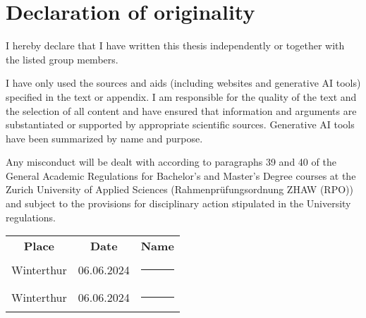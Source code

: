 \thispagestyle{empty}

\section*{Declaration of originality}

I hereby declare that I have written this thesis independently or together with the listed group members. 

I have only used the sources and aids (including websites and generative AI tools) specified in the text or appendix. I am responsible for the quality of the text and the selection of all content and have ensured that information and arguments are substantiated or supported by appropriate scientific sources. Generative AI tools have been summarized by name and purpose.

Any misconduct will be dealt with according to paragraphs 39 and 40 of the General Academic Regulations for Bachelor’s and Master’s Degree courses at the Zurich University of Applied Sciences (Rahmenprüfungsordnung ZHAW (RPO)) and subject to the provisions for disciplinary action stipulated in the University regulations.

\begin{table}[b]
    \centering
    \begin{tabular}{ccc}
        \textbf{Place} &  \textbf{Date} & \textbf{Name} \\
        Winterthur & 06.06.2024 & \rule{5cm}{0.2mm} \\
        Winterthur & 06.06.2024 & \rule{5cm}{0.2mm} \\
    \end{tabular}
\end{table}
